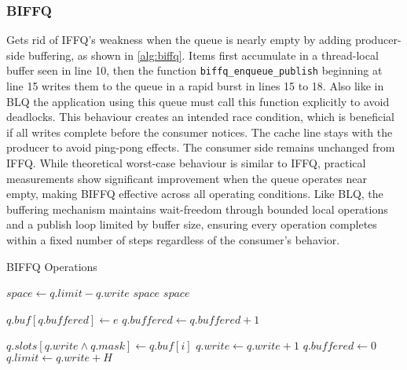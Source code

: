 \subsubsection{\acf{BIFFQ}}
Gets rid of \ac{IFFQ}'s weakness when the queue is nearly empty by adding producer-side buffering, as shown in \cref{alg:biffq}. Items first accumulate in a thread-local buffer seen in line 10, then the function \texttt{biffq\_enqueue\_publish} beginning at line 15 writes them to the queue in a rapid burst in lines 15 to 18. Also like in \ac{BLQ} the application using this queue must call this function explicitly to avoid deadlocks. This behaviour creates an intended race condition, which is beneficial if all writes complete before the consumer notices. The cache line stays with the producer to avoid ping-pong effects. The consumer side remains unchanged from \ac{IFFQ}. While theoretical worst-case behaviour is similar to \ac{IFFQ}, practical measurements show significant improvement when the queue operates near empty, making \ac{BIFFQ} effective across all operating conditions. Like \ac{BLQ}, the buffering mechanism maintains wait-freedom through bounded local operations and a publish loop limited by buffer size, ensuring every operation completes within a fixed number of steps regardless of the consumer's behavior. \cite{MaffioneCacheAware}

\begin{algorithm}[!ht]
    \centering
    \captionsetup{justification=centering}
    \caption{\ac{BIFFQ} Operations \cite{MaffioneCacheAware}}
    \label{alg:biffq}
    \scriptsize
    \begin{algorithmic}[1]
            \State $space \gets q.limit - q.write$
                \State \Return $space$ 
            \EndIf
            \State \Return $space$
        \EndFunction
        
        \State
        
            \State $q.buf[q.buffered] \gets e$ 
            \State $q.buffered \gets q.buffered + 1$
        \EndFunction
        
        \State
        
                \State $q.slots[q.write \land q.mask] \gets q.buf[i]$ 
                \State $q.write \gets q.write + 1$
            \EndFor
            \State $q.buffered \gets 0$
            \State $q.limit \gets q.write + H$ 
        \EndFunction
    \end{algorithmic}
\end{algorithm}

